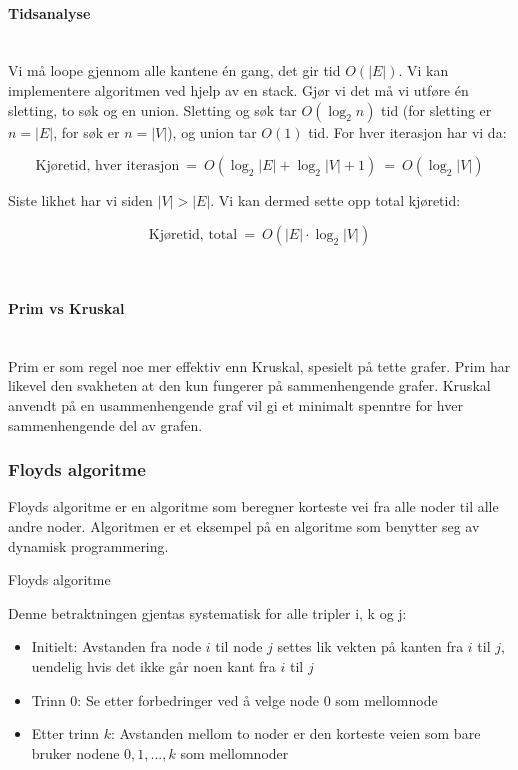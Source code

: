 \paragraph{Tidsanalyse}~\\
Vi må loope gjennom alle kantene én gang, det gir tid $ O(|E|) $. Vi kan implementere algoritmen ved hjelp av en stack. Gjør vi det må vi utføre én sletting, to søk og en union. Sletting og søk tar $ O(\log_2 n) $ tid (for sletting er $ n = |E| $, for søk er $ n = |V| $), og union tar $ O(1) $ tid. For hver iterasjon har vi da:

\[ \text{Kjøretid, hver iterasjon} ~=~ O(\log_2 |E| + \log_2 |V| + 1) ~=~ O(\log_2 |V|) \]

\noindent Siste likhet har vi siden $ |V| > |E| $. Vi kan dermed sette opp total kjøretid:

\[ \text{Kjøretid, total} ~=~ O(|E| \cdot \log_2 |V|) \]


~\\
\paragraph{Prim vs Kruskal}~\\
Prim er som regel noe mer effektiv enn Kruskal, spesielt på tette grafer. Prim har likevel den svakheten at den kun fungerer på sammenhengende grafer. Kruskal anvendt på en usammenhengende graf vil gi et minimalt spenntre for hver sammenhengende del av grafen.


\subsubsection{Floyds algoritme}
\label{floyd}

Floyds algoritme er en algoritme som beregner korteste vei fra alle noder til alle andre noder. Algoritmen er et eksempel på en algoritme som benytter seg av dynamisk programmering. 

\begin{teorem} Floyds algoritme

Denne betraktningen gjentas systematisk for alle tripler i, k og j:
\begin{itemize}
\item Initielt: Avstanden fra node $ i $ til node $ j $ settes lik vekten på kanten fra $ i $ til $ j $, uendelig hvis det ikke går noen kant fra $ i $ til $ j $
\item Trinn 0: Se etter forbedringer ved å velge node 0 som mellomnode
\item Etter trinn $ k $: Avstanden mellom to noder er den korteste veien som bare bruker nodene $ 0, 1, ... , k $ som mellomnoder
\end{itemize}
\end{teorem}

